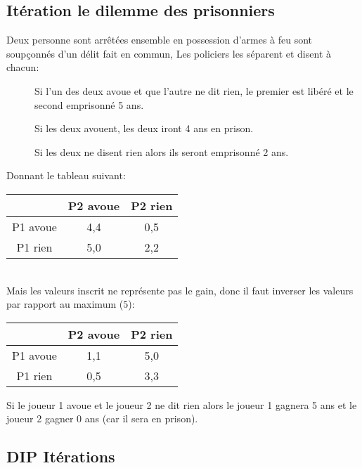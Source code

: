 \subsection{Itération le dilemme des prisonniers}
Deux personne sont arrêtées ensemble en possession d'armes à feu sont soupçonnés d'un délit fait en commun, Les policiers les séparent et disent à chacun:
\begin{description}
\item[] Si l'un des deux avoue et que l'autre ne dit rien, le premier est libéré et le second emprisonné 5 ans.
\item[] Si les deux avouent, les deux iront 4 ans en prison.
\item[] Si les deux ne disent rien alors ils seront emprisonné 2 ans.
\end{description}

Donnant le tableau suivant:
\begin{tabular}{c|cc}
$ $ & P2 avoue & P2 rien\\
\hline
P1 avoue & 4,4 & 0,5\\
P1 rien  & 5,0 & 2,2\\
\end{tabular}

\ \\
Mais les valeurs inscrit ne représente pas le gain, donc il faut inverser les valeurs par rapport au maximum ($5$):\\

\begin{tabular}{c|cc}
$ $ & P2 avoue & P2 rien\\
\hline
P1 avoue & 1,1 & 5,0\\
P1 rien  & 0,5 & 3,3\\
\end{tabular}

Si le joueur 1 avoue et le joueur 2 ne dit rien alors le joueur 1 gagnera 5 ans et le joueur 2 gagner 0 ans (car il sera en prison).\\

\subsection{DIP Itérations}

